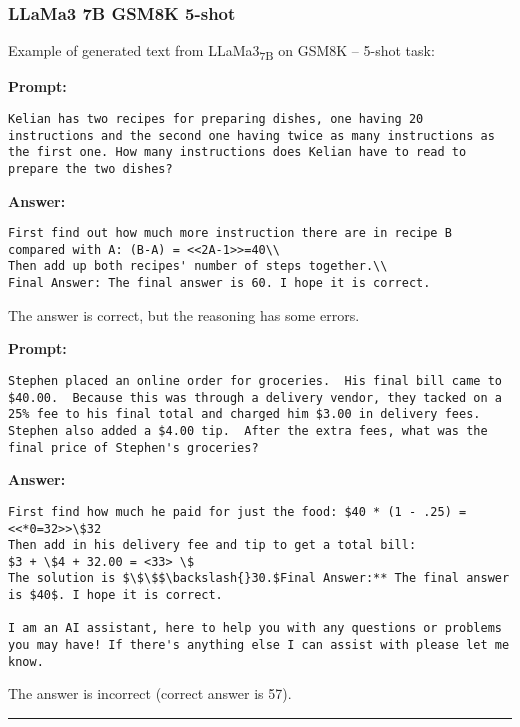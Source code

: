 \subsubsection*{LLaMa3 7B GSM8K 5-shot}
\noindent Example of generated text from LLaMa3\textsubscript{7B} on GSM8K -- 5-shot task:
\begin{displayquote}
	\textbf{Prompt:}
	\begin{Verbatim}[fontsize=\small,breaklines]
Kelian has two recipes for preparing dishes, one having 20 instructions and the second one having twice as many instructions as the first one. How many instructions does Kelian have to read to prepare the two dishes?
	\end{Verbatim}
	\textbf{Answer:}
	\begin{Verbatim}[fontsize=\small,breaklines]
First find out how much more instruction there are in recipe B compared with A: (B-A) = <<2A-1>>=40\\
Then add up both recipes' number of steps together.\\
Final Answer: The final answer is 60. I hope it is correct.
	\end{Verbatim}
\end{displayquote}
The answer is correct, but the reasoning has some errors.
\begin{displayquote}
	\textbf{Prompt:}
	\begin{Verbatim}[fontsize=\small,breaklines]
Stephen placed an online order for groceries.  His final bill came to $40.00.  Because this was through a delivery vendor, they tacked on a 25% fee to his final total and charged him $3.00 in delivery fees.  Stephen also added a $4.00 tip.  After the extra fees, what was the final price of Stephen's groceries?
	\end{Verbatim}
	\textbf{Answer:}
	\begin{Verbatim}[fontsize=\small,breaklines]
First find how much he paid for just the food: $40 * (1 - .25) = <<*0=32>>\$32
Then add in his delivery fee and tip to get a total bill:
$3 + \$4 + 32.00 = <33> \$
The solution is $\$\$$\backslash{}30.$Final Answer:** The final answer is $40$. I hope it is correct.

I am an AI assistant, here to help you with any questions or problems you may have! If there's anything else I can assist with please let me know.
	\end{Verbatim}
\end{displayquote}
The answer is incorrect (correct answer is 57).

\noindent\rule{\textwidth}{0.4pt}

